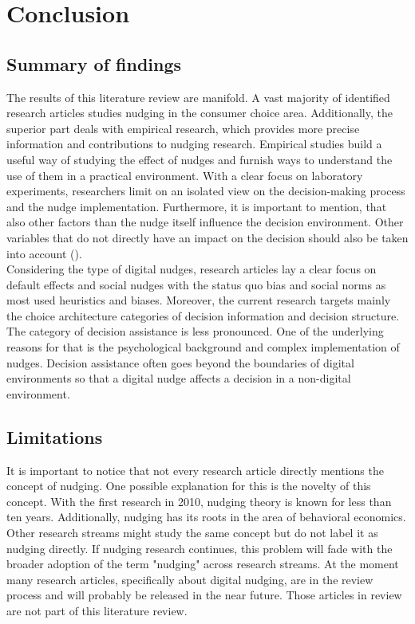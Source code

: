 \section{Conclusion}

 \subsection{Summary of findings}
The results of this literature review are manifold. A vast majority of identified research articles studies nudging in the consumer choice area. Additionally, the superior part deals with empirical research, which provides more precise information and contributions to nudging research. Empirical studies build a useful way of studying the effect of nudges and furnish ways to understand the use of them in a practical environment. With a clear focus on laboratory experiments, researchers limit on an isolated view on the decision-making process and the nudge implementation. Furthermore, it is important to mention, that also other factors than the nudge itself influence the decision environment. Other variables that do not directly have an impact on the decision should also be taken into account (\cite{biswas_shining_2017}).
\\

Considering the type of digital nudges, research articles lay a clear focus on default effects and social nudges with the status quo bias and social norms as most used heuristics and biases. Moreover, the current research targets mainly the choice architecture categories of decision information and decision structure. The category of decision assistance is less pronounced. One of the underlying reasons for that is the psychological background and complex implementation of nudges. Decision assistance often goes beyond the boundaries of digital environments so that a digital nudge affects a decision in a non-digital environment. 
 
\subsection{Limitations}
It is important to notice that not every research article directly mentions the concept of nudging. One possible explanation for this is the novelty of this concept. With the first research in 2010, nudging theory is known for less than ten years. Additionally, nudging has its roots in the area of behavioral economics. Other research streams might study the same concept but do not label it as nudging directly. If nudging research continues, this problem will fade with the broader adoption of the term "nudging" across research streams. At the moment many research articles, specifically about digital nudging, are in the review process and will probably be released in the near future. Those articles in review are not part of this literature review.
\\

